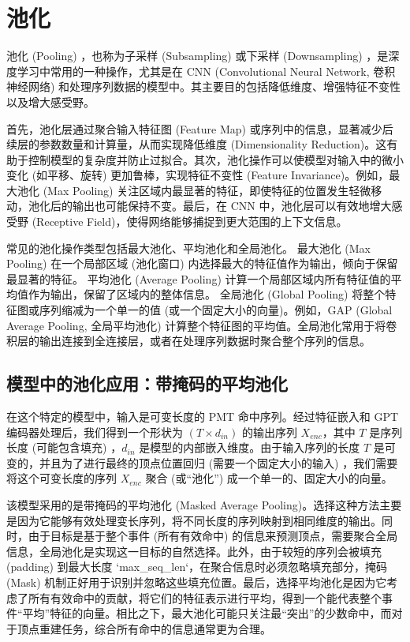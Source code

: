 
\chapter{池化}

池化 (Pooling) ，也称为子采样 (Subsampling) 或下采样 (Downsampling) ，是深度学习中常用的一种操作，尤其是在 CNN (Convolutional Neural Network, 卷积神经网络) 和处理序列数据的模型中。其主要目的包括降低维度、增强特征不变性以及增大感受野。

首先，池化层通过聚合输入特征图 (Feature Map) 或序列中的信息，显著减少后续层的参数数量和计算量，从而实现降低维度 (Dimensionality Reduction)。这有助于控制模型的复杂度并防止过拟合。其次，池化操作可以使模型对输入中的微小变化 (如平移、旋转) 更加鲁棒，实现特征不变性 (Feature Invariance)。例如，最大池化 (Max Pooling) 关注区域内最显著的特征，即使特征的位置发生轻微移动，池化后的输出也可能保持不变。最后，在 CNN 中，池化层可以有效地增大感受野 (Receptive Field)，使得网络能够捕捉到更大范围的上下文信息。

常见的池化操作类型包括最大池化、平均池化和全局池化。 最大池化 (Max Pooling) 在一个局部区域 (池化窗口) 内选择最大的特征值作为输出，倾向于保留最显著的特征。 平均池化 (Average Pooling) 计算一个局部区域内所有特征值的平均值作为输出，保留了区域内的整体信息。 全局池化 (Global Pooling) 将整个特征图或序列缩减为一个单一的值 (或一个固定大小的向量)。例如，GAP (Global Average Pooling, 全局平均池化) 计算整个特征图的平均值。全局池化常用于将卷积层的输出连接到全连接层，或者在处理序列数据时聚合整个序列的信息。

\section{模型中的池化应用：带掩码的平均池化}

在这个特定的模型中，输入是可变长度的 PMT 命中序列。经过特征嵌入和 GPT 编码器处理后，我们得到一个形状为 $(T \times d_{in})$ 的输出序列 $X_{enc}$，其中 $T$ 是序列长度 (可能包含填充) ，$d_{in}$ 是模型的内部嵌入维度。由于输入序列的长度 $T$ 是可变的，并且为了进行最终的顶点位置回归 (需要一个固定大小的输入) ，我们需要将这个可变长度的序列 $X_{enc}$ 聚合 (或“池化”) 成一个单一的、固定大小的向量。

该模型采用的是带掩码的平均池化 (Masked Average Pooling)。选择这种方法主要是因为它能够有效处理变长序列，将不同长度的序列映射到相同维度的输出。同时，由于目标是基于整个事件 (所有有效命中) 的信息来预测顶点，需要聚合全局信息，全局池化是实现这一目标的自然选择。此外，由于较短的序列会被填充 (padding) 到最大长度 `max\_seq\_len`，在聚合信息时必须忽略填充部分，掩码 (Mask) 机制正好用于识别并忽略这些填充位置。最后，选择平均池化是因为它考虑了所有有效命中的贡献，将它们的特征表示进行平均，得到一个能代表整个事件“平均”特征的向量。相比之下，最大池化可能只关注最“突出”的少数命中，而对于顶点重建任务，综合所有命中的信息通常更为合理。

